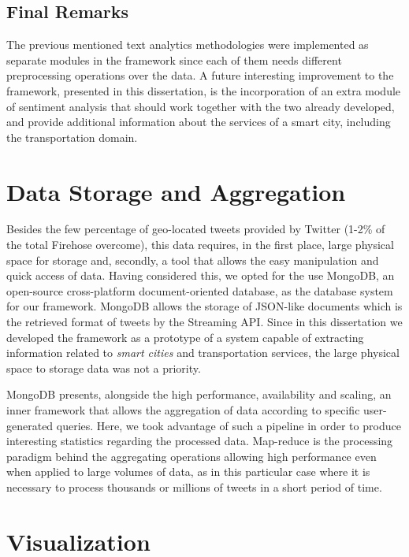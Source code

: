 \subsection{Final Remarks}

The previous mentioned text analytics methodologies were implemented as separate modules in the framework since each of them needs different preprocessing operations over the data. A future interesting improvement to the framework, presented in this dissertation, is the incorporation of an extra module of sentiment analysis that should work together with the two already developed, and provide additional information about the services of a smart city, including the transportation domain.

\section{Data Storage and Aggregation}\label{sec:storage_aggregations}

Besides the few percentage of geo-located tweets provided by Twitter (1-2\% of the total Firehose overcome), this data requires, in the first place, large physical space for storage and, secondly, a tool that allows the easy manipulation and quick access of data. Having considered this, we opted for the use MongoDB, an open-source cross-platform document-oriented database, as the database system for our framework. MongoDB allows the storage of JSON-like documents which is the retrieved format of tweets by the Streaming API. Since in this dissertation we developed the framework as a prototype of a system capable of extracting information related to \textit{smart cities} and transportation services, the large physical space to storage data was not a priority.

MongoDB presents, alongside the high performance, availability and scaling, an inner framework that allows the aggregation of data according to specific user-generated queries. Here, we took advantage of such a pipeline in order to produce interesting statistics regarding the processed data. Map-reduce is the processing paradigm behind the aggregating operations allowing high performance even when applied to large volumes of data, as in this particular case where it is necessary to process thousands or millions of tweets in a short period of time.

\section{Visualization}\label{sec:visualization}

